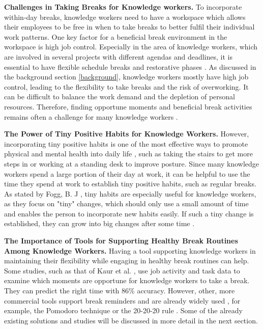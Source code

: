 \documentclass{hasel_thesis}
\begin{document}
\textbf{Challenges in Taking Breaks for Knowledge workers.}
To incorporate within-day breaks, knowledge workers need to have a workspace which allows their employees to be free in when to take breaks to better fulfil their individual work patterns. One key factor for a beneficial break environment in the workspace is high job control. Especially in the area of knowledge workers, which are involved in several projects with different agendas and deadlines, it is essential to have flexible schedule breaks and restorative phases \cite{Trougakos.2009}. As discussed in the background section \ref{background}, knowledge workers mostly have high job control, leading to the flexibility to take breaks and the risk of overworking. It can be difficult to balance the work demand and the depletion of personal resources. Therefore, finding opportune moments and beneficial break activities remains often a challenge for many knowledge workers \cite{Trougakos.2009}.


\textbf{The Power of Tiny Positive Habits for Knowledge Workers.}
However, incorporating tiny positive habits is one of the most effective ways to promote physical and mental health into daily life \cite{Taylor.2005}, such as taking the stairs to get more steps in or working at a standing desk to improve posture. Since many knowledge workers spend a large portion of their day at work, it can be helpful to use the time they spend at work to establish tiny positive habits, such as regular breaks. As stated by Fogg, B. J \cite{fogg2019}, tiny habits are especially useful for knowledge workers, as they focus on "tiny" changes, which should only use a small amount of time and enables the person to incorporate new habits easily. If such a tiny change is established, they can grow into big changes after some time \cite{fogg2019, clear2018}.

\textbf{The Importance of Tools for Supporting Healthy Break Routines Among Knowledge Workers.} Having a tool supporting knowledge workers in maintaining their flexibility while engaging in healthy break routines can help. Some studies, such as that of Kaur et al. \cite{Kaur.2020}, use job activity and task data to examine which moments are opportune for knowledge workers to take a break. They can predict the right time with 86\% accuracy. However, other, more commercial tools support break reminders and are already widely used \cite{Alghamdi.2020}, for example, the Pomodoro technique \cite{Cirillo.2006} or the 20-20-20 rule \cite{Min.2019}. Some of the already existing solutions and studies will be discussed in more detail in the next section.
\end{document}
